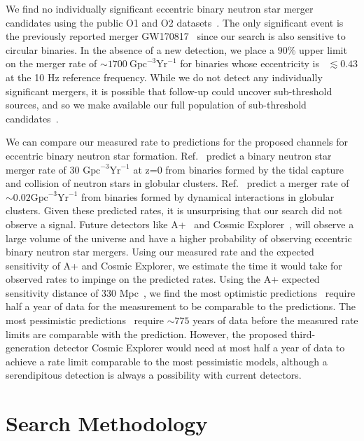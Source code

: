 We find no individually significant eccentric binary neutron star merger candidates using the public O1 and O2 datasets~\cite{Vallisneri:2014vxa}. The only significant event is the previously reported merger GW170817~\cite{TheLIGOScientific:2017qsa} since our search is also sensitive to circular binaries. In the absence of a new detection, we place a $90\%$ upper limit on the merger rate of $\sim 1700~\textrm{Gpc}^{-3}\textrm{Yr}^{-1}$ for binaries whose eccentricity is \ecc~$\lesssim0.43$ at the 10 Hz reference frequency. While we do not detect any individually significant mergers, it is possible that follow-up could uncover sub-threshold sources, and so we make available our full population of sub-threshold candidates~\cite{1-ECCBNS}.

We can compare our measured rate to predictions for the proposed channels for eccentric binary neutron star formation. Ref.~\cite{Lee:2009ca} predict a binary neutron star merger rate of 30 $\textrm{Gpc}^{-3} \textrm{Yr}^{-1}$ at z=0 from binaries formed by the tidal capture and collision of neutron stars in globular clusters. Ref.~\cite{Ye:2019xvf} predict a merger rate of $\sim 0.02 \textrm{Gpc}^{-3} \textrm{Yr}^{-1}$ from binaries formed by dynamical interactions in globular clusters. Given these predicted rates, it is unsurprising that our search did not observe a signal. Future detectors like A+~\cite{Aasi:2013wya} and Cosmic Explorer~\cite{Reitze:2019iox}, will observe a large volume of the universe and have a higher probability of observing eccentric binary neutron star mergers. Using our measured rate and the expected sensitivity of A+ and Cosmic Explorer, we estimate the time it would take for observed rates to impinge on the predicted rates. Using the A+ expected sensitivity distance of 330 Mpc~\cite{Aasi:2013wya}, we find the most optimistic predictions~\cite{Lee:2009ca} require half a year of data for the measurement to be comparable to the predictions. The most pessimistic predictions~\cite{Ye:2019xvf}  require $\sim 775$ years of data before the measured rate limits are comparable with the prediction. However, the proposed third-generation detector Cosmic Explorer would need at most half a year of data to achieve a rate limit comparable to the most pessimistic models, although a serendipitous detection is always a possibility with  current detectors.

\section{Search Methodology}   

